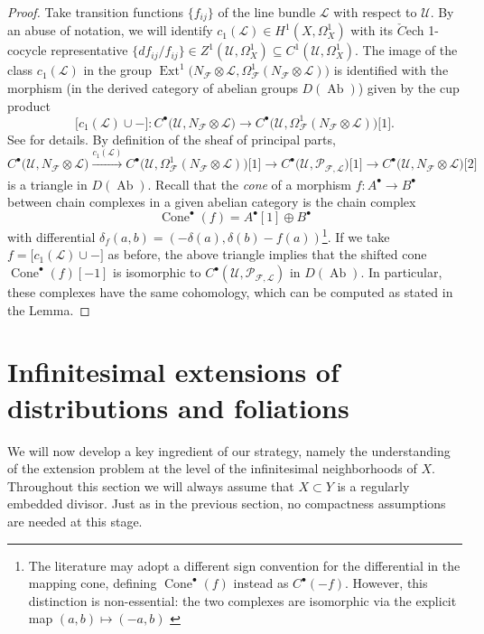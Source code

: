 \documentclass[reqno]{amsart}
\theoremstyle{plain}
\renewcommand{\L}{\mathcal{L}}
\newcommand{\U}{\mathcal{U}}
\newcommand{\F}{\mathscr{F}}
\newcommand{\PP}{\mathcal{P}}
\DeclareMathOperator{\Ext}{Ext}
\theoremstyle{definition}
\theoremstyle{named}
\begin{document}
\begin{proof}
Take transition functions $\{f_{ij}\}$ of the line bundle $\L$ with respect to $\U$. By an abuse of notation, we will identify $c_1(\L)\in H^1(X,\Omega^1_X)$ with its $\check{C}$ech 1-cocycle representative $\{df_{ij}/f_{ij}\}\in Z^{1}(\U,\Omega^1_X)\subseteq C^{1}(\U,\Omega^1_X)$. The image of the class $c_1(\L)$ in the group $\Ext^1\!\!\big(N_\F\otimes \L, \Omega^1_\F(N_\F\otimes \L)\big)$ is identified with the morphism (in the derived category of abelian groups $D(\operatorname{Ab})$) given by the cup product
\[
\big[c_1(\L)\cup -\big]: C^{\bullet}\big(\U,N_\F\otimes \L\big) \rightarrow  C^\bullet\big(\U,\Omega^1_\F(N_\F\otimes \L)\big) \big[1\big].
\]
See \cite[Prop. 1.4.3]{dimca2004sheaves} for details. By definition of the sheaf of principal parts,
\begin{equation*}\label{derived}
C^{\bullet}\big(\U,N_\F\otimes \L\big) \xrightarrow[]{c_1(\L)} C^{\bullet}\big(\U,\Omega^1_\F(N_\F\otimes \L)\big)\big[1\big]\rightarrow C^{\bullet}\big(\U,\PP_{\F,\L}\big)\big[1\big]\rightarrow  C^{\bullet}\big(\U,N_\F\otimes \L\big) \big[2\big]
\end{equation*}
is a triangle in $D(\operatorname{Ab})$. Recall that the \textit{cone} of a morphism $f: A^\bullet \rightarrow B^\bullet$ between chain complexes in a given abelian category is the chain complex
\[
\operatorname{Cone}^\bullet(f) = A^\bullet[1] \oplus B^\bullet
\]
with differential $\delta_f(a,b) = (-\delta(a),\delta(b)-f(a))$\footnote{The literature may adopt a different sign convention for the differential in the mapping cone, defining $\operatorname{Cone}^\bullet(f)$ instead as $C^\bullet(-f)$. However, this distinction is non-essential: the two complexes are isomorphic via the explicit map $(a,b)\mapsto (-a,b)$ \cite[p. 7]{dimca2004sheaves}}. If we take $f = \big[c_1(\L)\cup -\big]$ as before, the above triangle implies that the shifted cone $\operatorname{Cone}^\bullet(f)[-1]$ is isomorphic to $C^\bullet(\U,\PP_{\F,\L})$ in $D(\operatorname{Ab})$. In particular, these complexes have the same cohomology, which can be computed as stated in the Lemma.
\end{proof}

\section{Infinitesimal extensions of distributions and foliations}\label{section3}
We will now develop a key ingredient of our strategy, namely the understanding of the extension problem at the level of the infinitesimal neighborhoods of $X$. Throughout this section we will always assume that $X\subset Y$ is a regularly embedded divisor. Just as in the previous section, no compactness assumptions are needed at this stage. 
\end{document}
